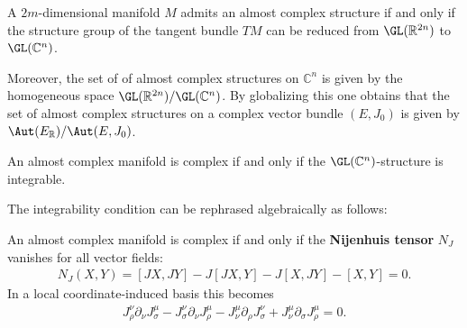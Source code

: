     \begin{property}
        A $2m$-dimensional manifold $M$ admits an almost complex structure if and only if the structure group of the tangent bundle $TM$ can be reduced from $\GL(\mathbb{R}^{2n})$ to $\GL(\mathbb{C}^n)$.

        Moreover, the set of of almost complex structures on $\mathbb{C}^n$ is given by the homogeneous space $\GL(\mathbb{R}^{2n})/\GL(\mathbb{C}^n)$. By globalizing this one obtains that the set of almost complex structures on a complex vector bundle $(E,J_0)$ is given by $\Aut(E_\mathbb{R})/\Aut(E,J_0)$.
    \end{property}


    \begin{property}
        An almost complex manifold is complex if and only if the $\GL(\mathbb{C}^n)$-structure is integrable.
    \end{property}
    The integrability condition can be rephrased algebraically as follows:
    \begin{theorem}
        An almost complex manifold is complex if and only if the \textbf{Nijenhuis tensor} $N_J$ vanishes for all vector fields:
        \begin{gather}
            \label{complex:integrable_structure}
            N_J(X,Y) = [JX,JY] - J[JX,Y] - J[X,JY] - [X,Y] = 0.
        \end{gather}
        In a local coordinate-induced basis this becomes
        \begin{gather}
            J_\rho^\nu\partial_\nu J_\sigma^\mu - J_\sigma^\nu\partial_\nu J_\rho^\mu - J_\nu^\mu\partial_\rho J_\sigma^\nu + J_\nu^\mu\partial_\sigma J_\rho^\mu = 0.
        \end{gather}
    \end{theorem}

